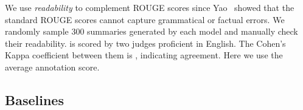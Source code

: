 We use \textit{readability} to complement ROUGE scores 
since Yao~\cite{YaoWX17} showed that the standard 
ROUGE scores cannot capture grammatical or factual errors. 
We randomly sample 300 summaries generated by each model
and manually check their readability. 
\DIFdelbegin {}%
\DIFdelend \DIFaddbegin {}\DIFaddend is scored by two judges proficient in English. 
The Cohen's Kappa coefficient between them is \DIFdelbegin {}\DIFdelend \DIFaddbegin {}\DIFaddend , 
indicating agreement. Here we use the average annotation score.

\subsection{Baselines}
\DIFdelbegin {}\DIFdelend \DIFaddbegin {}

